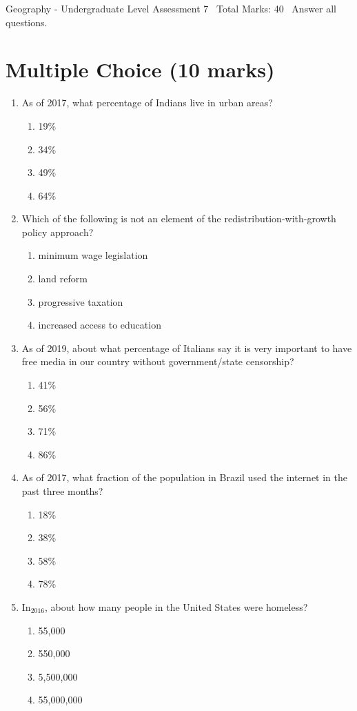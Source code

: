 \documentclass[12pt]{article}
\begin{document}
\begin{center}
Geography - Undergraduate Level Assessment 7 \
Total Marks: 40 \
Answer all questions.
\end{center}

\section*{Multiple Choice (10 marks)}
\begin{enumerate}[label=\arabic*.]
\item As of 2017, what percentage of Indians live in urban areas?
\begin{enumerate}[label=(\alph*)]
    \item 19\%
    \item 34\%
    \item 49\%
    \item 64\%
\end{enumerate}
\item Which of the following is not an element of the redistribution-with-growth policy approach?
\begin{enumerate}[label=(\alph*)]
    \item minimum wage legislation
    \item land reform
    \item progressive taxation
    \item increased access to education
\end{enumerate}
\item As of 2019, about what percentage of Italians say it is very important to have free media in our country without government/state censorship?
\begin{enumerate}[label=(\alph*)]
    \item 41\%
    \item 56\%
    \item 71\%
    \item 86\%
\end{enumerate}
\item As of 2017, what fraction of the population in Brazil used the internet in the past three months?
\begin{enumerate}[label=(\alph*)]
    \item 18\%
    \item 38\%
    \item 58\%
    \item 78\%
\end{enumerate}
\item In$_{2016}$, about how many people in the United States were homeless?
\begin{enumerate}[label=(\alph*)]
    \item 55,000
    \item 550,000
    \item 5,500,000
    \item 55,000,000
\end{enumerate}
\end{enumerate}
\end{document}
